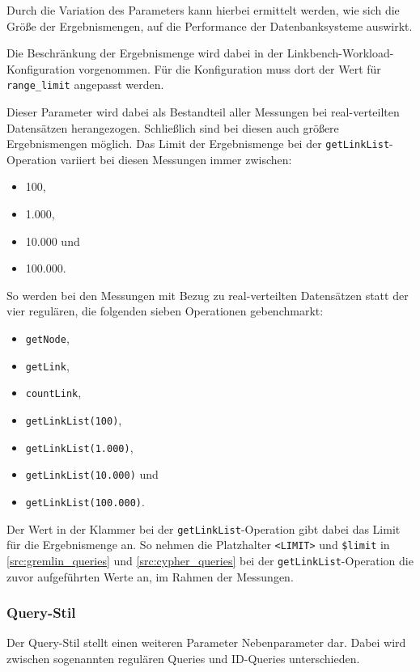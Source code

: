 Durch die Variation des Parameters kann hierbei ermittelt werden, wie sich die Größe der Ergebnismengen, auf die Performance der Datenbanksysteme auswirkt. 

Die Beschränkung der Ergebnismenge wird dabei in der Linkbench-Workload-Konfiguration vorgenommen. Für die Konfiguration muss dort der Wert für \texttt{range\_limit} angepasst werden. 

Dieser Parameter wird dabei als Bestandteil aller Messungen bei real-verteilten Datensätzen herangezogen. Schließlich sind bei diesen auch größere Ergebnismengen möglich. Das Limit der Ergebnismenge bei der \texttt{getLinkList}-Operation variiert bei diesen Messungen immer zwischen: 
\begin{itemize}
    \item 100,
    \item 1.000,
    \item 10.000 und
    \item 100.000.
\end{itemize}

So werden bei den Messungen mit Bezug zu real-verteilten Datensätzen statt der vier regulären, die folgenden sieben Operationen gebenchmarkt:
\begin{itemize}
    \item \texttt{getNode},
    \item \texttt{getLink},
    \item \texttt{countLink},
    \item \texttt{getLinkList(100)},
    \item \texttt{getLinkList(1.000)},
    \item \texttt{getLinkList(10.000)} und
    \item \texttt{getLinkList(100.000)}.
\end{itemize}

Der Wert in der Klammer bei der \texttt{getLinkList}-Operation gibt dabei das Limit für die Ergebnismenge an. So nehmen die Platzhalter \texttt{<LIMIT>} und \texttt{\$limit}
in \autoref{src:gremlin_queries} und \autoref{src:cypher_queries} bei der \texttt{getLinkList}-Operation die zuvor aufgeführten Werte an, im Rahmen der Messungen.

\subsubsection{Query-Stil}
Der Query-Stil stellt einen weiteren Parameter Nebenparameter dar. Dabei wird zwischen sogenannten regulären Queries und ID-Queries unterschieden. 

